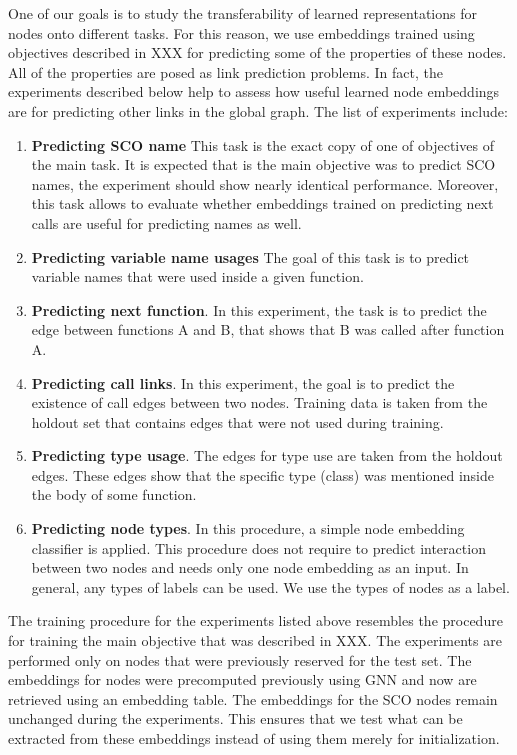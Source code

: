\documentclass[a4paper,twoside]{article}
\begin{document}
One of our goals is to study the transferability of learned representations for nodes onto different tasks. For this reason, we use embeddings trained using objectives described in XXX for predicting some of the properties of these nodes. All of the properties are posed as link prediction problems. In fact, the experiments described below help to assess how useful learned node embeddings are for predicting other links in the global graph. The list of experiments include:
\begin{enumerate}
    \item \textbf{Predicting SCO name} 
    This task is the exact copy of one of objectives of the main task. It is expected that is the main objective was to predict SCO names, the experiment should show nearly identical performance. Moreover, this task allows to evaluate whether embeddings trained on predicting next calls are useful for predicting names as well. 
    \item \textbf{Predicting variable name usages}
    The goal of this task is to predict variable names that were used inside a given function.
    \item \textbf{Predicting next function}.
    In this experiment, the task is to predict the edge between functions A and B, that shows that B was called after function A. 
    \item \textbf{Predicting call links}. 
    In this experiment, the goal is to predict the existence of call edges between two nodes. Training data is taken from the holdout set that contains edges that were not used during training. 
    \item \textbf{Predicting type usage}.
    The edges for type use are taken from the holdout edges. These edges show that the specific type (class) was mentioned inside the body of some function. 
    \item \textbf{Predicting node types}.
    In this procedure, a simple node embedding classifier is applied. This procedure does not require to predict interaction between two nodes and needs only one node embedding as an input. In general, any types of labels can be used. We use the types of nodes as a label.
\end{enumerate}

The training procedure for the experiments listed above resembles the procedure for training the main objective that was described in XXX. The experiments are performed only on nodes that were previously reserved for the test set. The embeddings for nodes were precomputed previously using GNN and now are retrieved using an embedding table. The embeddings for the SCO nodes remain unchanged during the experiments. This ensures that we test what can be extracted from these embeddings instead of using them merely for initialization. 
\end{document}
